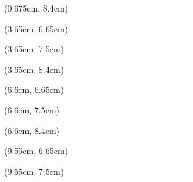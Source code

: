\documentclass[aspectratio=3219]{beamer}
\begin{document}
{\begin{frame}
\begin{textblock*}{3cm}(0.675cm, 8.4cm)
    \centering
    \textcolor{white}{\tiny \it Ουγγαρία \\}
\end{textblock*}

\begin{textblock*}{2.95cm}(3.65cm, 6.65cm)
    \centering
    \textcolor{white}{\tiny \bf2 \\}
\end{textblock*}

\begin{textblock*}{2.95cm}(3.65cm, 7.5cm)
    \centering
    \textcolor{white}{\scriptsize ΠΕΤΡΟΠΟΥΛΟΥ ΠΗΝΕΛΟΠΗ \\}
\end{textblock*}

\begin{textblock*}{2.95cm}(3.65cm, 8.4cm)
    \centering
    \textcolor{white}{\tiny \it Ιαπωνία \\}
\end{textblock*}

\begin{textblock*}{2.95cm}(6.6cm, 6.65cm)
    \centering
    \textcolor{white}{\tiny \bf3\\}
\end{textblock*}

\begin{textblock*}{2.95cm}(6.6cm, 7.5cm)
    \centering
    \textcolor{white}{\scriptsize ΓΟΥΣΟΥΤΙΔΗ ΧΡΙΣΤΙΝΑ \\}
\end{textblock*}

\begin{textblock*}{2.95cm}(6.6cm, 8.4cm)
    \centering
    \textcolor{white}{\tiny \it Βενεζουέλα \\}
\end{textblock*}

\begin{textblock*}{2.95cm}(9.55cm, 6.65cm)
    \centering
    \textcolor{white}{\tiny \bf3\\}
\end{textblock*}

\begin{textblock*}{2.95cm}(9.55cm, 7.5cm)
    \centering
    \textcolor{white}{\scriptsize ΤΟΜΑΡΑΣ ΑΛΕΞΑΝΔΡΟΣ \\}
\end{textblock*}


\end{frame}}
\end{document}
